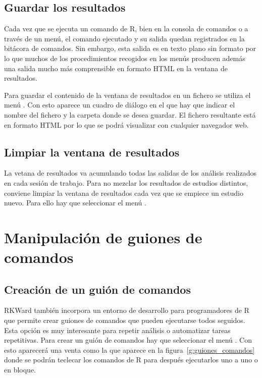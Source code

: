 \subsection{Guardar los resultados}
Cada vez que se ejecuta un comando de R, bien en la consola de comandos o a través de un menú, el comando ejecutado y su
salida quedan registrados en la bitácora de comandos. Sin embargo, esta salida es en texto plano sin formato por lo que
muchos de los procedimientos recogidos en los menús producen además una salida mucho más comprensible en formato HTML en
la ventana de resultados.

Para guardar el contenido de la ventana de resultados en un fichero se utiliza el menú .
Con esto aparece un cuadro de diálogo en el que hay que indicar el nombre del fichero y la carpeta donde se desea
guardar. El fichero resultante está en formato HTML por lo que se podrá visualizar con cualquier navegador web.

\subsection{Limpiar la ventana de resultados}
La vetana de resultados va acumulando todas las salidas de los análisis realizados en cada sesión de trabajo. 
Para no mezclar los resultados de estudios distintos, conviene limpiar la ventana de resultados cada vez que se empiece un estudio nuevo.
Para ello hay que seleccionar el menú .
 

\section{Manipulación de guiones de comandos}

\subsection{Creación de un guión de comandos}
RKWard también incorpora un entorno de desarrollo para programadores de R que permite crear guiones de comandos que
pueden ejecutarse todos seguidos.
Esta opción es muy interesante para repetir análisis o automatizar tareas repetitivas.
Para crear un guión de comandos hay que seleccionar el menú .
Con esto aparecerá una venta como la que aparece en la figura~\ref{g:guiones_comandos} donde se podrán teclecar los
comandos de R para después ejecutarlos uno a uno o en bloque.

